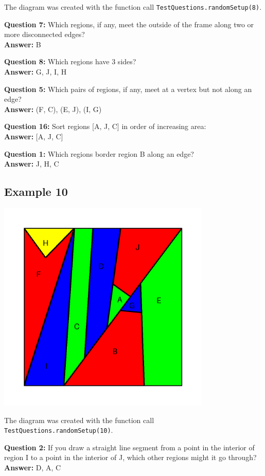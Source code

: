 \documentclass{article}    %
\begin{document}
{\small  The diagram was created with the function 
call {\tt TestQuestions.randomSetup(8)}.}


{\bf Question  7:} Which regions, if any, meet the outside of the frame along two or more disconnected edges? \\
{\bf Answer:}  {B}

{\bf Question  8:} Which regions have 3 sides? \\
{\bf Answer:}  {G, J, I, H}

{\bf Question  5:} Which pairs of regions, if any, meet at a vertex but not along an edge? \\
{\bf Answer:}  {(F, C), (E, J), (I, G)}

{\bf Question  16:} Sort regions [A, J, C] in order of increasing area: \\
{\bf Answer:}  [A, J, C]

{\bf Question  1:} Which regions border region B along an edge? \\
{\bf Answer:}  {J, H, C}


\pagebreak

\subsection{Example 10}
\begin{center}
\includegraphics[height=4in]{Maps/RandomSetup10.png}
\end{center}

{\small  The diagram was created with the function 
call {\tt TestQuestions.randomSetup(10)}.}

{\bf Question  2:} If you draw a straight line segment from a point in the interior of region I to  a point in the interior of J, which other regions might it go through? \\
{\bf Answer:}  {D, A, C}
\end{document}
